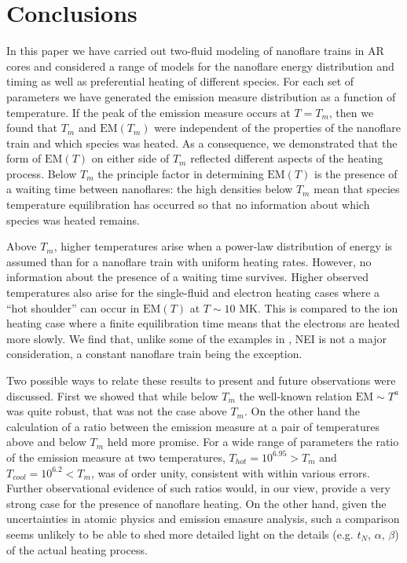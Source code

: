 \documentclass[preprint,linenumbers]{aastex}
\begin{document}
	\section{Conclusions}
	\label{sec:conclusions}
	\par In this paper we have carried out two-fluid modeling of nanoflare trains in AR cores and considered a range of models for the nanoflare energy distribution and timing as well as preferential heating of different species. For each set of parameters we have generated the emission measure distribution as a function of temperature. If the peak of the emission measure occurs at $T = T_m$, then we found that $T_m$ and $\mathrm{EM}(T_m)$ were independent of the properties of the nanoflare train and which species was heated. As a consequence, we demonstrated that the form of $\mathrm{EM}(T)$ on either side of $T_m$ reflected different aspects of the heating process. Below $T_m$ the principle factor in determining $\mathrm{EM}(T)$ is the presence of a waiting time between nanoflares: the high densities below $T_m$ mean that species temperature equilibration has occurred so that no information about which species was heated remains.
	\par Above $T_m$, higher temperatures arise when a power-law distribution of energy is assumed than for a nanoflare train with uniform heating rates. However, no information about the presence of a waiting time survives. Higher observed temperatures also arise for the single-fluid and electron heating cases where a ``hot shoulder'' can occur in $\mathrm{EM}(T)$ at $T\sim10$ MK. This is compared to the ion heating case where a finite equilibration time means that the electrons are heated more slowly. We find that, unlike some of the examples in , NEI is not a major consideration, a constant nanoflare train being the exception.
	\par Two possible ways to relate these results to present and future observations were discussed. First we showed that while below $T_m$ the well-known relation $\mathrm{EM}\sim T^a$ was quite robust, that was not the case above $T_m$. On the other hand the calculation of a ratio between the emission measure at a pair of temperatures above and below $T_m$ held more promise. For a wide range of parameters the ratio of the emission measure at two temperatures, $T_{hot}=10^{6.95}>T_m$ and $T_{cool}=10^{6.2}<T_m$, was of order unity, consistent with \citet{brosius_pervasive_2014} within various errors. Further observational evidence of such ratios would, in our view, provide a very strong case for the presence of nanoflare heating. On the other hand, given the uncertainties in atomic physics and emission emasure analysis, such a comparison seems unlikely to be able to shed more detailed light on the details (e.g. $t_N$, $\alpha$, $\beta$) of the actual heating process.
\end{document}
